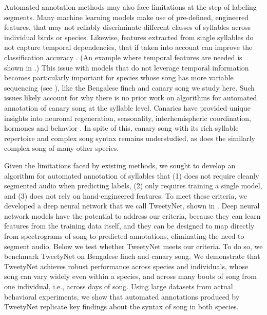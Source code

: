\documentclass[9pt,lineno]{elife}
\begin{document}
Automated annotation methods may also face limitations at the step of labeling segments.
Many machine learning models make use of pre-defined, engineered features,  
that may not reliably discriminate different classes of syllables across individual birds or species. 
Likewise, features extracted from single syllables do not capture temporal dependencies,  
that if taken into account can improve the classification accuracy 
\citep{anderson1996template,kogan1998automated,nicholson2016comparison}. 
(An example where temporal features are needed is shown in .) 
This issue with models that do not leverage temporal information 
becomes particularly important for species whose song has more variable sequencing
(see ), 
like the Bengalese finch and canary song we study here.
Such issues likely account for why there is  
no prior work on algorithms for automated annotation of canary song at the syllable level. 
Canaries have provided unique insights 
into neuronal regeneration, seasonality, interhemispheric coordination, hormones and behavior
\citep{goldmanNeuronalProductionMigration1983,nottebohmBrainAllSeasons1981,suthersBilateralCoordinationMotor2012,wilbrechtNeuronAdditionLoss2004,alvarez-buyllaBirthProjectionNeurons1990,gardner_freedom_2005}. 
In spite of this, canary song with its rich syllable repertoire and complex song syntax  
\citep{markowitz_long-range_2013,alonso_low-dimensional_2009,appeltants_effect_2005,alliende_species-specific_2013} remains understudied, as does the similarly complex song of many other species.

Given the limitations faced by existing methods, 
we sought to develop an algorithm for automated annotation of syllables that  
(1) does not require cleanly segmented audio when predicting labels, 
(2) only requires training a single model, and 
(3) does not rely on hand-engineered features.
To meet these criteria, we developed a deep neural network 
that we call TweetyNet, shown in . 
Deep neural network models have the potential to address our criteria, 
because they can learn features from the training data itself, 
and they can be designed to map directly from 
spectrograms of song to predicted annotations, 
eliminating the need to segment audio. 
Below we test whether TweetyNet meets our criteria.
To do so, we benchmark TweetyNet on Bengalese finch and canary song. 
We demonstrate that TweetyNet achieves robust performance  
across species and individuals, whose song can vary widely even within a species,  
and across many bouts of song from one individual, i.e., across days of song. 
Using large datasets from actual behavioral experiments, 
we show that automated annotations 
produced by TweetyNet replicate key findings about 
the syntax of song in both species.
\end{document}
